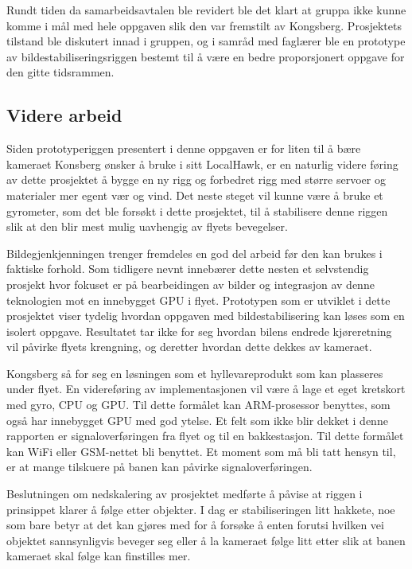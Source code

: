 Rundt tiden da samarbeidsavtalen ble revidert ble det klart at gruppa ikke kunne komme i mål med hele oppgaven slik den var fremstilt av Kongsberg. Prosjektets tilstand ble diskutert innad i gruppen, og i samråd med faglærer ble en prototype av bildestabiliseringsriggen bestemt til å være en bedre proporsjonert oppgave for den gitte tidsrammen.

\subsection{Videre arbeid}
Siden prototyperiggen presentert i denne oppgaven er for liten til å bære kameraet Konsberg ønsker å bruke i sitt LocalHawk, er en naturlig videre føring av dette prosjektet å bygge en ny rigg og forbedret rigg med større servoer og materialer mer egent vær og vind. Det neste steget vil kunne være å bruke et gyrometer, som det ble forsøkt i dette prosjektet, til å stabilisere denne riggen slik at den blir mest mulig uavhengig av flyets bevegelser. 

Bildegjenkjenningen trenger fremdeles en god del arbeid før den kan brukes i faktiske forhold. Som tidligere nevnt innebærer dette nesten et selvstendig prosjekt hvor fokuset er på bearbeidingen av bilder og integrasjon av denne teknologien mot en innebygget GPU i flyet. Prototypen som er utviklet i dette prosjektet viser tydelig hvordan oppgaven med bildestabilisering kan løses som en isolert oppgave. Resultatet tar ikke for seg hvordan bilens endrede kjøreretning vil påvirke flyets krengning, og deretter hvordan dette dekkes av kameraet.

Kongsberg så for seg en løsningen som et hyllevareprodukt som kan plasseres under flyet. En videreføring av implementasjonen vil være å lage et eget kretskort med gyro, CPU og GPU. Til dette formålet kan ARM-prosessor benyttes, som også har innebygget GPU med god ytelse. Et felt som ikke blir dekket i denne rapporten er signaloverføringen fra flyet og til en bakkestasjon. Til dette formålet kan WiFi eller GSM-nettet bli benyttet. Et moment som må bli tatt hensyn til, er at mange tilskuere på banen kan påvirke signaloverføringen.

Beslutningen om nedskalering av prosjektet medførte å påvise at riggen i prinsippet klarer å følge etter objekter. I dag er stabiliseringen litt hakkete, noe som bare betyr at det kan gjøres med for å forsøke å enten forutsi hvilken vei objektet sannsynligvis beveger seg eller å la kameraet følge litt etter slik at banen kameraet skal følge kan finstilles mer.

